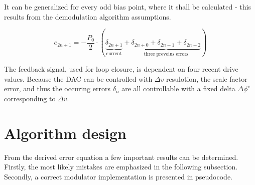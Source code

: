 \documentclass{article}
\begin{document}
\noindent
It can be generalized for every odd bias point, where it shall be calculated - this results from the demodulation algorithm assumptions.

\begin{equation}
    e_{2n+1} = -\frac{P_0}{2} \cdot (\underbrace{\delta_{2n+1}}_{\text{current}} + \underbrace{\delta_{2n+0} + \delta_{2n-1} + \delta_{2n-2}}_{\text{three prevoius errors}})
    \label{eq:difference_generic}
\end{equation}

\noindent
The feedback signal, used for loop closure, is dependent on four recent drive values. Because the DAC can be controlled with $\Delta{}v$ resulotion, the scale factor error, and thus the occuring errors $\delta_n$ are all controllable with a fixed delta $\Delta\phi^{v}$ corresponding to $\Delta{}v$.

\section{Algorithm design}
From the derived error equation a few important results can be determined. Firstly, the most likely mistakes are emphasized in the following subsection. Secondly, a correct modulator implementation is presented in pseudocode.



\end{document}
